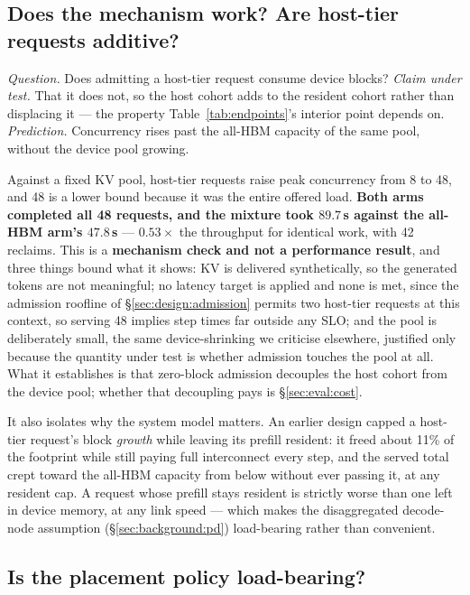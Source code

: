 \subsection{Does the mechanism work? Are host-tier requests additive?}
\label{sec:eval:capacity}

\emph{Question.} Does admitting a host-tier request consume device blocks?
\emph{Claim under test.} That it does not, so the host cohort adds to the resident
cohort rather than displacing it --- the property Table~\ref{tab:endpoints}'s
interior point depends on. \emph{Prediction.} Concurrency rises past the all-HBM
capacity of the same pool, without the device pool growing.

Against a fixed KV pool, host-tier requests raise peak concurrency from 8 to 48,
and 48 is a lower bound because it was the entire offered load. \textbf{Both arms
completed all 48 requests, and the mixture took $89.7$\,s against the all-HBM
arm's $47.8$\,s} --- $0.53\times$ the throughput for identical work, with 42
reclaims.
This is a \textbf{mechanism check and not a performance result}, and three things
bound what it shows: KV is delivered synthetically, so the generated tokens are not
meaningful; no latency target is applied and none is met, since the admission
roofline of \S\ref{sec:design:admission} permits two host-tier requests at this
context, so serving 48 implies step times far outside any SLO; and the pool is
deliberately small, the same device-shrinking we criticise elsewhere, justified only
because the quantity under test is whether admission touches the pool at all. What
it establishes is that zero-block admission decouples the host cohort from the
device pool; whether that decoupling pays is \S\ref{sec:eval:cost}.

It also isolates why the system model matters. An earlier design capped a host-tier
request's block \emph{growth} while leaving its prefill resident: it freed about
11\% of the footprint while still paying full interconnect every step, and the
served total crept toward the all-HBM capacity from below without ever passing it,
at any resident cap. A request whose prefill stays resident is strictly worse than
one left in device memory, at any link speed --- which makes the disaggregated
decode-node assumption (\S\ref{sec:background:pd}) load-bearing rather than
convenient.

\subsection{Is the placement policy load-bearing?}
\label{sec:eval:ablation}

